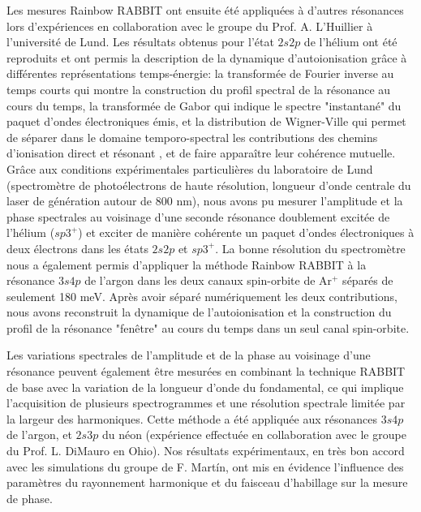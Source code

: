 Les mesures Rainbow RABBIT ont ensuite été appliquées à d'autres résonances lors d'expériences en collaboration avec le groupe du Prof. A. L'Huillier à l'université de Lund. Les résultats obtenus pour l'état $2s2p$ de l'hélium ont été reproduits et ont permis la description de la dynamique d'autoionisation grâce à différentes représentations temps-énergie: la transformée de Fourier inverse au temps courts qui montre la construction du profil spectral de la résonance au cours du temps, la transformée de Gabor qui indique le spectre "instantané" du paquet d'ondes électroniques émis, et la distribution de Wigner-Ville qui permet de séparer dans le domaine temporo-spectral les contributions des chemins d'ionisation direct et résonant , et de faire apparaître leur cohérence mutuelle. Grâce aux conditions expérimentales particulières du laboratoire de Lund (spectromètre de photoélectrons de haute résolution, longueur d'onde centrale du laser de génération autour de 800 nm), nous avons pu mesurer l'amplitude et la phase spectrales au voisinage d'une seconde résonance doublement excitée de l'hélium ($sp3^+$) et exciter de manière cohérente un paquet d'ondes électroniques à deux électrons dans les états $2s2p$ et $sp3^+$. La bonne résolution du spectromètre nous a également permis d'appliquer la méthode Rainbow RABBIT à la résonance $3s4p$ de l'argon dans les deux canaux spin-orbite de Ar$^+$ séparés de seulement 180 meV. Après avoir séparé numériquement les deux contributions, nous avons reconstruit la dynamique de l'autoionisation et la construction du profil de la résonance "fenêtre" au cours du temps dans un seul canal spin-orbite. 

Les variations spectrales de l'amplitude et de la phase au voisinage d'une résonance peuvent également être mesurées en combinant la technique RABBIT de base avec la variation de la longueur d'onde du fondamental, ce qui implique l'acquisition de plusieurs spectrogrammes et une résolution spectrale limitée par la largeur des harmoniques. Cette méthode a été appliquée aux résonances $3s4p$ de l'argon, et $2s3p$ du néon (expérience effectuée en collaboration avec le groupe du Prof. L. DiMauro en Ohio). Nos résultats expérimentaux, en très bon accord avec les simulations du groupe de F. Mart\'{i}n, ont mis en évidence l'influence des paramètres du rayonnement harmonique et du faisceau d'habillage sur la mesure de phase.

